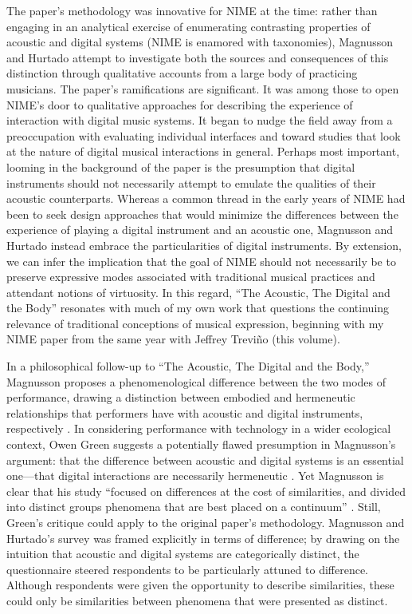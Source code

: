 The paper's methodology was innovative for NIME at the time: rather than engaging in an analytical exercise of enumerating contrasting properties of acoustic and digital systems (NIME is enamored with taxonomies), Magnusson and Hurtado attempt to investigate both the sources and consequences of this distinction through qualitative accounts from a large body of practicing musicians. The paper's ramifications are significant. It was among those to open NIME's door to qualitative approaches for describing the experience of interaction with digital music systems. It began to nudge the field away from a preoccupation with evaluating individual interfaces and toward studies that look at the nature of digital musical interactions in general. Perhaps most important, looming in the background of the paper is the presumption that digital instruments should not necessarily attempt to emulate the qualities of their acoustic counterparts. Whereas a common thread in the early years of NIME had been to seek design approaches that would minimize the differences between the experience of playing a digital instrument and an acoustic one, Magnusson and Hurtado instead embrace the particularities of digital instruments. By extension, we can infer the implication that the goal of NIME should not necessarily be to preserve expressive modes associated with traditional musical practices and attendant notions of virtuosity. In this regard, ``The Acoustic, The Digital and the Body'' resonates with much of my own work that questions the continuing relevance of traditional conceptions of musical expression, beginning with my NIME paper from the same year with Jeffrey Trevi\~{n}o (this volume).

In a philosophical follow-up to ``The Acoustic, The Digital and the Body,'' Magnusson proposes a phenomenological difference between the two modes of performance, drawing a distinction between embodied and hermeneutic relationships that performers have with acoustic and digital instruments, respectively \cite{Magnusson:2009a}. In considering performance with technology in a wider ecological context, Owen Green suggests a potentially flawed presumption in Magnusson's argument: that the difference between acoustic and digital systems is an essential one---that digital interactions are necessarily hermeneutic \cite{Green:2011}. Yet Magnusson is clear that his study ``focused on differences at the cost of similarities, and divided into distinct groups phenomena that are best placed on a continuum'' \cite{Magnusson:2009a}. Still, Green's critique could apply to the original paper's methodology. Magnusson and Hurtado's survey was framed explicitly in terms of difference; by drawing on the intuition that acoustic and digital systems are categorically distinct, the questionnaire steered respondents to be particularly attuned to difference. Although respondents were given the opportunity to describe similarities, these could only be similarities between phenomena that were presented as distinct. 

